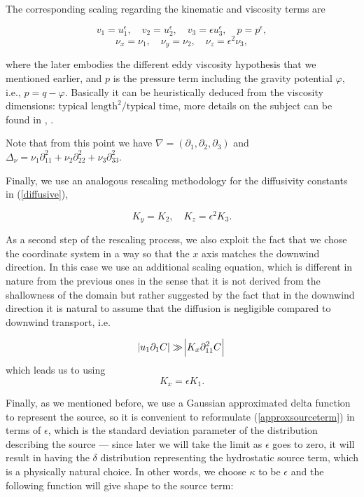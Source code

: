 \documentclass[11pt]{article}
\begin{document}
     The corresponding scaling regarding the kinematic and viscosity terms are
     
    \[v_1 = u_1^{\epsilon}, \quad v_2 = u_2^{\epsilon}, \quad v_3 = \epsilon u_3^{\epsilon}, \quad p = p^{\epsilon}, \]
    \[\nu_x = \nu_1, \quad \nu_y = \nu_2 , \quad \nu_z = \epsilon ^ 2\nu_3, \]
    
    where the later embodies the different eddy viscosity hypothesis that we mentioned earlier, and $p$ is the pressure term including the gravity potential $\varphi,$ i.e., $p = q - \varphi$. Basically it can be heuristically deduced from the viscosity dimensions: $\text{typical length}^2 / \text{typical time}$, more details on the subject can be found in \cite{besson1992some}, \cite{azerad2001mathematical}.
    
    Note that from this point we have $\nabla = (\partial_1, \partial_2, \partial_3) $ and $ \Delta_\nu = \nu_1 \partial^2_{11} + \nu_2 \partial^2_{22}  + \nu_3 \partial^2_{33} $. 
    
    Finally, we use an analogous rescaling methodology for the diffusivity constants in (\ref{diffusive}),
    
    \[ K_y = K_2, \quad K_z = \epsilon ^ 2 K_3. \]
    
    As a second step of the rescaling process, we also exploit the fact that we chose the coordinate system in a way so that the $x$ axis matches the downwind direction. In this case we use an additional scaling equation, which is different in nature from the previous ones in the sense that it is not derived from the shallowness of the domain but rather suggested by the fact that in the downwind direction it is natural to assume that the diffusion is negligible compared to downwind transport, i.e.
    
    \begin{equation} \abs{u_1 \partial_{1} C} \gg \abs{ K_x \partial_{11} ^2 C }\end{equation}
    which leads us to using
    \[ K_x = \epsilon K_1.\]
    
Finally, as we mentioned before, we use a Gaussian approximated delta function to represent the source, so it is convenient to reformulate (\ref{approxsourceterm}) in terms of $\epsilon$, which is the standard deviation parameter of the distribution describing the source --- since later we will take the limit as $\epsilon$ goes to zero, it will result in having the $\delta$ distribution representing the hydrostatic source term, which is a physically natural choice. In other words, we choose $\kappa$ to be $\epsilon$ and the following function will give shape to the source term:
\end{document}
